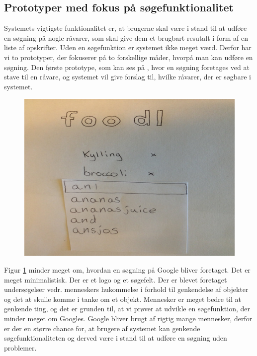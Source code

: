 \subsection{Prototyper med fokus på søgefunktionalitet}
\label{subsec:prototype1}
Systemets vigtigste funktionalitet er, at brugerne skal være i stand til at udføre en søgning på nogle råvarer, som skal give dem et brugbart resutalt i form af en liste af opskrifter. Uden en søgefunktion er systemet ikke meget værd. Derfor har vi to prototyper, der fokuserer på to forskellige måder, hvorpå man kan udføre en søgning. Den første prototype, som kan ses på , hvor en søgning foretages ved at stave til en råvare, og systemet vil give forslag til, hvilke råvarer, der er søgbare i systemet. 

\begin{figure}[H]
	\centering
	\includegraphics[scale=0.7]{billeder/prototyper/prototype1a.png}
	\label{fig:prototype1adesign}
\end{figure}

Figur \ref{fig:prototype1adesign} minder meget om, hvordan en søgning på \fx Google bliver foretaget. Det er meget minimalistisk. Der er et logo og et søgefelt. Der er blevet foretaget undersøgelser vedr. menneskers hukommelse i forhold til genkendelse af objekter og det at skulle komme i tanke om et objekt. Mennesker er meget bedre til at genkende ting, og det er grunden til, at vi prøver at udvikle en søgefunktion, der minder meget om Googles.\cite[p. ~340]{deb} Google bliver brugt af rigtig mange mennesker, derfor er der en større chance for, at brugere af systemet kan genkende søgefunktionaliteten og derved være i stand til at udføre en søgning uden problemer.

